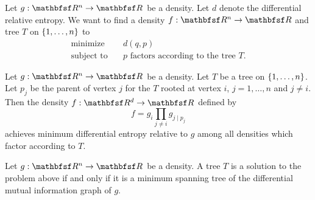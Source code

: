 Let $g: \R^n \to \R$ be a density.
Let $d$ denote the differential
relative entropy.  We want to find a density $f: \R^n \to \R$
and tree $T$ on
$\{1, \dots, n\}$ to
\[
  \begin{aligned}
    \text{minimize}   &\quad d(q, p) \\
    \text{subject to} &\quad p \text{ factors according to the tree } T.
  \end{aligned}
\]


\begin{prop}
  Let $g: \R^n \to \R$ be a density.
  Let $T$ be
  a tree on $\{1, \dots, n\}$.
  Let $p_j$ be
  the parent of vertex $j$ for the $T$ rooted
  at vertex $i$, $j = 1,\dots,n$ and $j \neq i$.
  Then the density $f: \R^d \to \R$ defined by
  \[
    f = g_i \prod_{j \neq i} g_{j \mid p_j}
  \]
  achieves minimum differential entropy relative to $g$ among
  all densities which factor according to $T$.
\end{prop}

\begin{prop}
  Let $g: \R^n \to \R$ be a density.
  A tree $T$ is a solution to the problem above
  if and only if it is a minimum spanning
  tree of the differential mutual information graph of $g$.
\end{prop}
\strats
